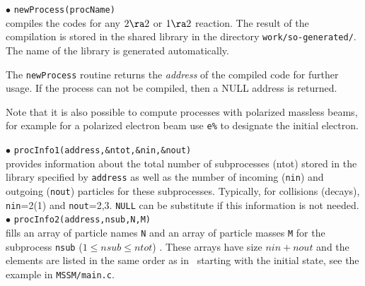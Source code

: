 \documentclass[12pt,a4paper]{article}
\begin{document}
\noindent
$\bullet$ \verb|newProcess(procName)|\\
compiles the  codes for any $2\ra 2$ or  $1\ra 2$  reaction.
The result of the compilation is stored in the  shared library  in the directory \verb|work/so-generated/|. The name of the library is generated
automatically.

The \verb|newProcess| routine returns the
{\it address} of the compiled code for further usage.   If the
process can not be compiled, then a NULL address is
returned. 


Note that it is also possible to compute processes with polarized massless beams, 
for example for a polarized electron beam use \verb|e%|
 to designate the initial
electron.



\noindent
$\bullet$ \verb|procInfo1(address,&ntot,&nin,&nout)|\\
provides information  about the total number of subprocesses
(ntot) stored in the library  specified by {\tt address} as well
as the number of incoming (\verb|nin|) and outgoing (\verb|nout|) particles for
these subprocesses. Typically, for collisions (decays), \verb|nin|=2(1) and \verb|nout|=2,3.
\verb|NULL| can be substitute if this information is not needed. \\
$\bullet$ \verb|procInfo2(address,nsub,N,M)|\\
fills an array of
particle names \verb|N| and an array of particle  masses \verb|M| for the subprocess \verb|nsub| ($1\leq nsub \leq ntot$) . These
arrays have size $nin+nout$ and the elements are listed in the same order
as in \calchep\ starting with the initial state, see the example in 
\verb|MSSM/main.c|.\\
\end{document}

